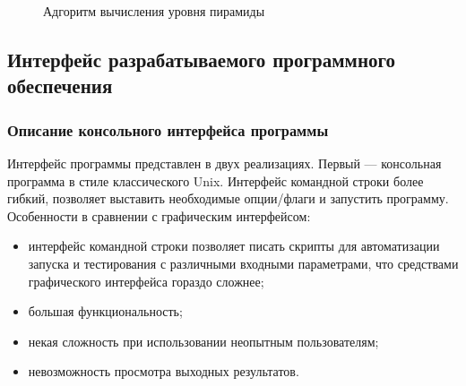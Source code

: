 \begin{figure}
\caption{Адгоритм вычисления уровня пирамиды}
\label{fig:calc_pyr}
\end{figure}

\subsection {Интерфейс разрабатываемого программного обеспечения}
\subsubsection{Описание консольного интерфейса программы}%
Интерфейс программы представлен в двух реализациях.
Первый — консольная программа в стиле классического Unix. Интерфейс командной строки более гибкий, позволяет выставить необходимые опции/флаги и запустить программу. Особенности в сравнении с графическим интерфейсом:
\begin{itemize}
\item интерфейс командной строки позволяет писать скрипты для автоматизации запуска и тестирования с различными входными параметрами, что средствами графического интерфейса гораздо сложнее;
\item большая функциональность;
\item некая сложность при использовании неопытным пользователям;
\item невозможность просмотра выходных результатов.
\end{itemize}

